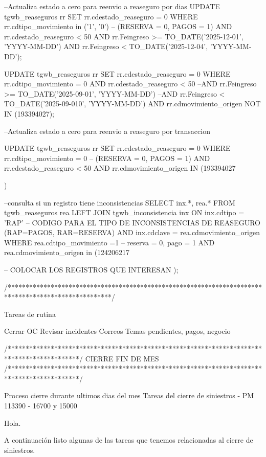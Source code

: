 --Actualiza estado a cero para reenvio a reaseguro por dias
UPDATE tgwb_reaseguros rr
SET    rr.cdestado_reaseguro = 0
WHERE rr.cdtipo_movimiento in ('1', '0') -- (RESERVA = 0, PAGOS = 1)
  AND rr.cdestado_reaseguro < 50
  AND rr.Feingreso >= TO_DATE('2025-12-01', 'YYYY-MM-DD')
  AND rr.Feingreso < TO_DATE('2025-12-04', 'YYYY-MM-DD');
  

UPDATE tgwb_reaseguros rr
SET rr.cdestado_reaseguro = 0
WHERE rr.cdtipo_movimiento = 0
  AND rr.cdestado_reaseguro < 50
  --AND rr.Feingreso >= TO_DATE('2025-09-01', 'YYYY-MM-DD')
  --AND rr.Feingreso < TO_DATE('2025-09-010', 'YYYY-MM-DD')
  AND rr.cdmovimiento_origen NOT IN (193394027);


--Actualiza estado a cero para reenvio a reaseguro por transaccion
 
UPDATE tgwb_reaseguros rr
SET    rr.cdestado_reaseguro = 0
WHERE  rr.cdtipo_movimiento = 0 -- (RESERVA = 0, PAGOS = 1)
AND    rr.cdestado_reaseguro < 50
AND    rr.cdmovimiento_origen IN (193394027

)

--consulta si un registro tiene inconsistencias
SELECT inx.*, rea.*
FROM   tgwb_reaseguros rea
LEFT JOIN tgwb_inconsistencia inx
ON     inx.cdtipo = 'RAP' -- CODIGO PARA EL TIPO DE INCONSISTENCIAS DE REASEGURO (RAP=PAGOS, RAR=RESERVA)
AND    inx.cdclave = rea.cdmovimiento_origen
WHERE  rea.cdtipo_movimiento =1 -- reserva = 0, pago = 1
AND    rea.cdmovimiento_origen in (124206217


 -- COLOCAR LOS REGISTROS QUE INTERESAN
);

/*****************************************************************************************************/

Tareas de rutina

Cerrar OC
Revisar incidentes
Correos
Temas pendientes, pagos, negocio


/********************************************************************************************/
CIERRE FIN DE MES
/********************************************************************************************/

Proceso cierre durante ultimos dias del mes
Tareas del cierre de siniestros - PM 113390 - 16700 y 15000

Hola.
 
A continuación listo algunas de las tareas que tenemos relacionadas al cierre de siniestros.
 
